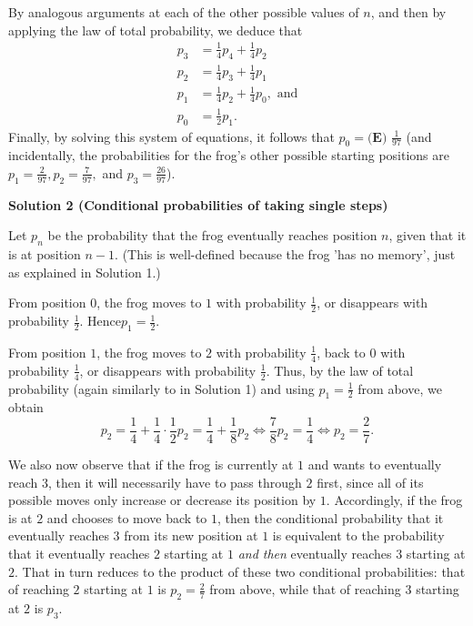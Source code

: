 \begin{enumerate}
 
By analogous arguments at each of the other possible values of $n$, and then by applying the law of total probability, we deduce that
 \begin{align*}p_3 &= \frac{1}{4}p_4 + \frac{1}{4}p_2 \\ p_2 &= \frac{1}{4}p_3 + \frac{1}{4}p_1 \\ p_1 &= \frac{1}{4}p_2 + \frac{1}{4}p_0, \text{ and} \\ p_0 &= \frac{1}{2}p_1.\end{align*}
Finally, by solving this system of equations, it follows that $p_0 = \boxed{\textbf{(E) } \frac{1}{97}}$ (and incidentally, the probabilities for the frog's other possible starting positions are $p_1 = \frac{2}{97}, p_2 = \frac{7}{97},$ and $p_3 = \frac{26}{97}$).

 



\textbf{Solution 2 (Conditional probabilities of taking single steps)}

Let $p_n$ be the probability that the frog eventually reaches position $n$, given that it is at position $n-1$. (This is well-defined because the frog 'has no memory', just as explained in Solution 1.)

 From position $0$, the frog moves to $1$ with probability $\frac{1}{2}$, or disappears with probability $\frac{1}{2}$. Hence$p_1 = \frac{1}{2}$.

 From position $1$, the frog moves to $2$ with probability $\frac{1}{4}$, back to $0$ with probability $\frac{1}{4}$, or disappears with probability $\frac{1}{2}$. Thus, by the law of total probability (again similarly to in Solution 1) and using $p_1 = \frac{1}{2}$ from above, we obtain
 \[p_2 = \frac{1}{4} + \frac{1}{4} \cdot \frac{1}{2} p_2 = \frac{1}{4} + \frac{1}{8} p_2 \iff \frac{7}{8} p_2 = \frac{1}{4} \iff p_2 = \frac{2}{7}.\]

 
We also now observe that if the frog is currently at $1$ and wants to eventually reach $3$, then it will necessarily have to pass through $2$ first, since all of its possible moves only increase or decrease its position by $1$. Accordingly, if the frog is at $2$ and chooses to move back to $1$, then the conditional probability that it eventually reaches $3$ from its new position at $1$ is equivalent to the probability that it eventually reaches $2$ starting at $1$ \textit{and then} eventually reaches $3$ starting at $2$. That in turn reduces to the product of these two conditional probabilities: that of reaching $2$ starting at $1$ is $p_2 = \frac{2}{7}$ from above, while that of reaching $3$ starting at $2$ is $p_3$.


\end{enumerate}
